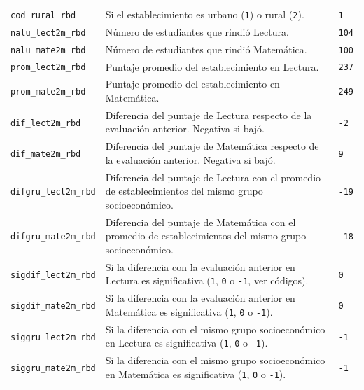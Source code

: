 \documentclass[10.5pt]{article}
\begin{document}
\begin{xltabular}{\linewidth}{@{}p{4.5cm} >{\raggedright\arraybackslash}X p{3.4cm}@{}}
\texttt{cod\_\allowbreak{}rural\_\allowbreak{}rbd} & Si el establecimiento es urbano (\texttt{1}) o rural (\texttt{2}). & \texttt{1} \\
\texttt{nalu\_\allowbreak{}lect2m\_\allowbreak{}rbd} & Número de estudiantes que rindió Lectura. & \texttt{104} \\
\texttt{nalu\_\allowbreak{}mate2m\_\allowbreak{}rbd} & Número de estudiantes que rindió Matemática. & \texttt{100} \\
\texttt{prom\_\allowbreak{}lect2m\_\allowbreak{}rbd} & Puntaje promedio del establecimiento en Lectura. & \texttt{237} \\
\texttt{prom\_\allowbreak{}mate2m\_\allowbreak{}rbd} & Puntaje promedio del establecimiento en Matemática. & \texttt{249} \\
\texttt{dif\_\allowbreak{}lect2m\_\allowbreak{}rbd} & Diferencia del puntaje de Lectura respecto de la evaluación anterior. Negativa si bajó. & \texttt{-2} \\
\texttt{dif\_\allowbreak{}mate2m\_\allowbreak{}rbd} & Diferencia del puntaje de Matemática respecto de la evaluación anterior. Negativa si bajó. & \texttt{9} \\
\texttt{difgru\_\allowbreak{}lect2m\_\allowbreak{}rbd} & Diferencia del puntaje de Lectura con el promedio de establecimientos del mismo grupo socioeconómico. & \texttt{-19} \\
\texttt{difgru\_\allowbreak{}mate2m\_\allowbreak{}rbd} & Diferencia del puntaje de Matemática con el promedio de establecimientos del mismo grupo socioeconómico. & \texttt{-18} \\
\texttt{sigdif\_\allowbreak{}lect2m\_\allowbreak{}rbd} & Si la diferencia con la evaluación anterior en Lectura es significativa (\texttt{1}, \texttt{0} o \texttt{-1}, ver códigos). & \texttt{0} \\
\texttt{sigdif\_\allowbreak{}mate2m\_\allowbreak{}rbd} & Si la diferencia con la evaluación anterior en Matemática es significativa (\texttt{1}, \texttt{0} o \texttt{-1}). & \texttt{0} \\
\texttt{siggru\_\allowbreak{}lect2m\_\allowbreak{}rbd} & Si la diferencia con el mismo grupo socioeconómico en Lectura es significativa (\texttt{1}, \texttt{0} o \texttt{-1}). & \texttt{-1} \\
\texttt{siggru\_\allowbreak{}mate2m\_\allowbreak{}rbd} & Si la diferencia con el mismo grupo socioeconómico en Matemática es significativa (\texttt{1}, \texttt{0} o \texttt{-1}). & \texttt{-1} \\

\end{xltabular}
\end{document}
